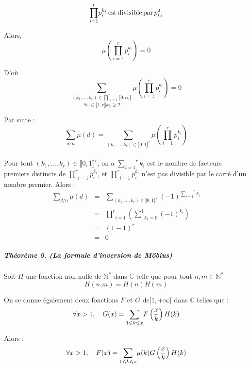 \[ \underset{i = 1}{\overset{r}{\prod}} p^{k_i}_i \operatorname{est} \operatorname{divisible}
   \operatorname{par} p^2_{i_0 } \]


Alors,
\[ \mu \left( \underset{i = 1}{\overset{r}{\prod}} p^{k_i}_i \right) = 0 \]


D'o{\`u}
\[ \underset{\exists i_0 \in \llbracket 1, r \rrbracket k_{i_0} \geqslant
   2}{\underset{(k_1, \ldots, k_r) \in \underset{i = 1}{\overset{r}{\prod}}
   \llbracket 0, \alpha_i \rrbracket}{\overset{}{\sum}}} \mu \left(
   \underset{i = 1}{\overset{r}{\prod}} p^{k_i}_i \right) = 0 \]


Par suite :
\[ \underset{d / n}{\sum} \mu (d) = \underset{}{\underset{(k_1, \ldots, k_r)
   \in \llbracket 0, 1 \rrbracket^r}{\overset{}{\sum}}} \mu \left( \underset{i
   = 1}{\overset{r}{\prod}} p^{k_i}_i \right) \]


Pour tout $(k_1, \ldots, k_r) \in \llbracket 0, 1 \rrbracket^r$, on a
$\overset{r}{\underset{i = 1}{\sum}} k_i$ est le nombre de facteurs premiers
distincts de $\underset{i = 1}{\overset{r}{\prod}} p^{k_i}_i$, et $\underset{i
= 1}{\overset{r}{\prod}} p^{k_i}_i$ n'est pas divisible par le carr{\'e} d'un
nombre premier. Alors :
\begin{eqnarray*}
  \underset{d / n}{\sum} \mu (d) & = & \underset{}{\underset{(k_1, \ldots,
  k_r) \in \llbracket 0, 1 \rrbracket^r}{\overset{}{\sum}}} (-
  1)^{\overset{r}{\underset{i = 1}{\sum}} k_i}\\
  & = & \underset{i = 1}{\overset{r}{\prod}} \left( \underset{k_1 =
  0}{\overset{1 }{\sum}} (- 1)^{k_i} \right)\\
  & = & (1 - 1)^r\\
  & = & 0
\end{eqnarray*}


\subparagraph{Th{\'e}or{\`e}me 9. (La formule d'inversion de M{\"o}bius)}

Soit $H$ une fonction non nulle de $\mathbb{N}^{\ast}$ dans $\mathbb{C}$ telle
que pour tout $n, m \in \mathbb{N}^{\ast}$
\[ H (n.m) = H (n) H (m) \]


On se donne {\'e}galement deux fonctions $F$ et $G$ de$[1, + \infty [$ dans
$\mathbb{C}$ telles que :
\[ \forall x > 1, \quad {\color[HTML]{000000}{\color[HTML]{000000}G (x) =
   \underset{1 \leqslant k \leqslant x}{\sum} F \left( \frac{x}{k} \right) H
   (k)}} \]


Alors :
\[ \forall x > 1, \quad {\color[HTML]{000000}{\color[HTML]{000000}F (x) =
   \underset{1 \leqslant k \leqslant x}{\sum} \mu (k) G \left( \frac{x}{k}
   \right) H (k)}} \]


